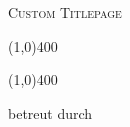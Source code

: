 \centering
{\scshape\LARGE Custom Titlepage \par}
{\scshape\LARGE \firma \par}
\vspace{1cm}
{\scshape\Large \arbeitstyp \par}
\vspace{1.5cm}
{\line(1,0){400} \par}
{\huge\bfseries \titel \par}
{\line(1,0){400} \par}
\vspace{2cm}
{\Large \fach \par }
\vspace{1cm}
{\Large\itshape \autor \par}
{\itshape \id \par}
\vfill
{betreut durch \par}
{\betreuertitel \ \betreuer \par}
\vfill
{\large \abgabedatum \par}